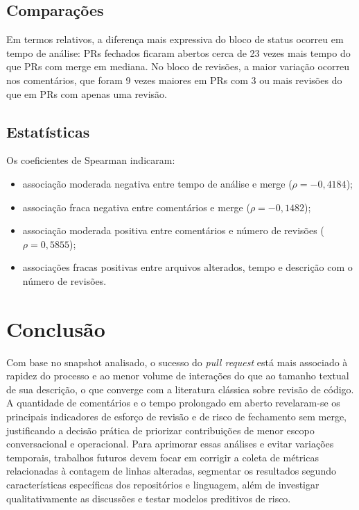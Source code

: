 \documentclass[12pt,a4paper]{article}
\begin{document}
\subsection{Compara\c{c}\~oes}
Em termos relativos, a diferen\c{c}a mais expressiva do bloco de status ocorreu em tempo de an\'alise: PRs fechados ficaram abertos cerca de 23 vezes mais tempo do que PRs com merge em mediana. No bloco de revis\~oes, a maior varia\c{c}\~ao ocorreu nos coment\'arios, que foram 9 vezes maiores em PRs com 3 ou mais revis\~oes do que em PRs com apenas uma revis\~ao.

\newpage

\subsection{Estat\'isticas}
Os coeficientes de Spearman indicaram:
\begin{itemize}[leftmargin=1.5cm]
\item associa\c{c}\~ao moderada negativa entre tempo de an\'alise e merge ($\rho = -0{,}4184$);
\item associa\c{c}\~ao fraca negativa entre coment\'arios e merge ($\rho = -0{,}1482$);
\item associa\c{c}\~ao moderada positiva entre coment\'arios e n\'umero de revis\~oes ($\rho = 0{,}5855$);
\item associa\c{c}\~oes fracas positivas entre arquivos alterados, tempo e descri\c{c}\~ao com o n\'umero de revis\~oes.
\end{itemize}

\section{Conclus\~ao}

Com base no snapshot analisado, o sucesso do \textit{pull request} est\'a mais associado \`a rapidez do processo e ao menor volume de intera\c{c}\~oes do que ao tamanho textual de sua descri\c{c}\~ao, o que converge com a literatura cl\'assica sobre revis\~ao de c\'odigo. A quantidade de coment\'arios e o tempo prolongado em aberto revelaram-se os principais indicadores de esfor\c{c}o de revis\~ao e de risco de fechamento sem merge, justificando a decis\~ao pr\'atica de priorizar contribui\c{c}\~oes de menor escopo conversacional e operacional. Para aprimorar essas an\'alises e evitar varia\c{c}\~oes temporais, trabalhos futuros devem focar em corrigir a coleta de m\'etricas relacionadas \`a contagem de linhas alteradas, segmentar os resultados segundo caracter\'isticas espec\'ificas dos reposit\'orios e linguagem, al\'em de investigar qualitativamente as discuss\~oes e testar modelos preditivos de risco.
\end{document}
